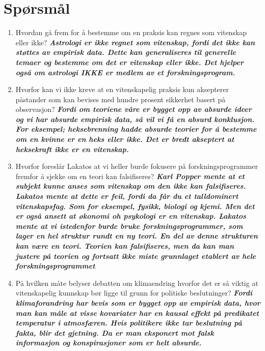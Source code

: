 \documentclass[11pt]{article}
\begin{document}
\section{Spørsmål}
\begin{enumerate}
    \item Hvordan gå frem for å bestemme om en praksis kan regnes som vitenskap eller ikke?
    \textbf{\textit{Astrologi er ikke regnet som vitenskap, fordi det ikke kan støttes av empirisk data. Dette kan generaliseres til generelle temaer og bestemme om det er vitenskap eller ikke. Det hjelper også om astrologi IKKE er medlem av et forskningsprogram. }}
    \item Hvorfor kan vi ikke kreve at en vitenskapelig praksis kun aksepterer påstander som kan bevises med hundre prosent sikkerhet basert på observasjon?
    \textbf{\textit{Fordi om teoriene våre er bygget opp av absurde ideer og vi har absurde empirisk data, så vil vi få en absurd konklusjon. For eksempel; heksebrenning hadde absurde teorier for å bestemme om en kvinne er en heks eller ikke. Det er bredt akseptert at heksekraft ikke er en vitenskap.}}
    \item Hvorfor foreslår Lakatos at vi heller burde fokusere på forskningsprogrammer fremfor å sjekke om en teori kan falsifiseres?
    \textbf{\textit{Karl Popper mente at et subjekt kunne anses som vitenskap om den ikke kan falsifiseres. Lakatos mente at dette er feil, fordi da får du et talldominert vitenskapsfag. Som for eksempel, fysikk, biologi og kjemi. Men det er også ansett at økonomi oh psykologi er en vitenskap. Lakatos mente at vi istedenfor burde bruke forskningsprogrammer, som lager en hel struktur rundt en ny teori. En del av denne strukturen kan være en teori. Teorien kan falsifiseres, men da kan man justere på teorien og fortsatt ikke miste grunnlaget etablert av hele forskningsprogrammet}}
    \item På hvilken måte belyser debatten om klimaendring hvorfor det er så viktig at vitenskapelig kunnskap bør ligge til grunn for politiske beslutninger?
    \textbf{\textit{Fordi klimaforandring har bevis som er bygget opp av empirisk data, hvor man kan måle at visse kovariater har en kausal effekt på predikatet temperatur i atmosfæren. Hvis politikere ikke tar beslutning på fakta, blir det gjetning. Da er man eksponert mot falsk informasjon og konspirasjoner som er helt absurde.}}
\end{enumerate}
\end{document}
